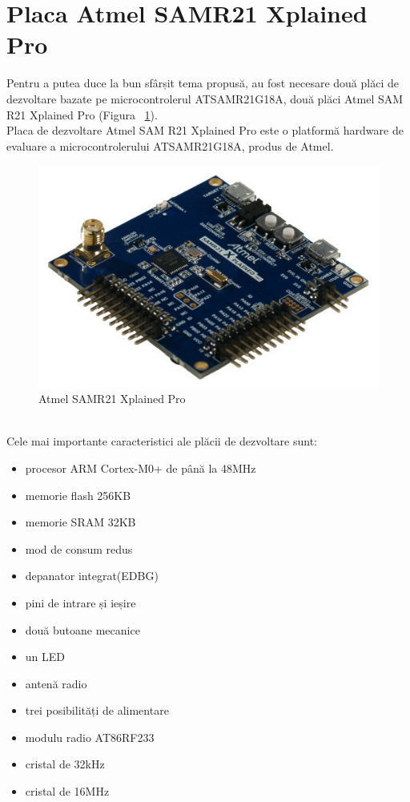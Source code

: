 \documentclass[12pt,a4paper]{report}
\begin{document}
\section{Placa Atmel SAMR21 Xplained Pro}
Pentru a putea duce la bun sfârșit tema propusă, au fost necesare două plăci de dezvoltare bazate pe microcontrolerul ATSAMR21G18A, două plăci Atmel SAM R21 Xplained Pro (Figura ~\ref{fig:samr21}). \\
Placa de dezvoltare Atmel SAM R21 Xplained Pro este o platformă hardware de evaluare a microcontrolerului ATSAMR21G18A, produs de Atmel\cite{samr21ug}. \\
\begin{figure}[th]
\centering
\includegraphics[scale=0.7]{pics/samr21.jpg}
  \caption{Atmel SAMR21 Xplained Pro}
  \label{fig:samr21}
\end{figure}\\
Cele mai importante caracteristici ale plăcii de dezvoltare sunt:
\begin{itemize}
	\item{procesor ARM Cortex-M0+ de până la 48MHz}
	\item{memorie flash 256KB}
	\item{memorie SRAM 32KB}
	\item{mod de consum redus}
	\item{depanator integrat(EDBG)}
	\item{pini de intrare și ieșire}
	\item{două butoane mecanice}
	\item{un LED}
	\item{antenă radio}
	\item{trei posibilități de alimentare}
	\item{modulu radio AT86RF233\cite{at86rf}}
	\item{cristal de 32kHz}
	\item{cristal de 16MHz}
\end{itemize}
\end{document}
